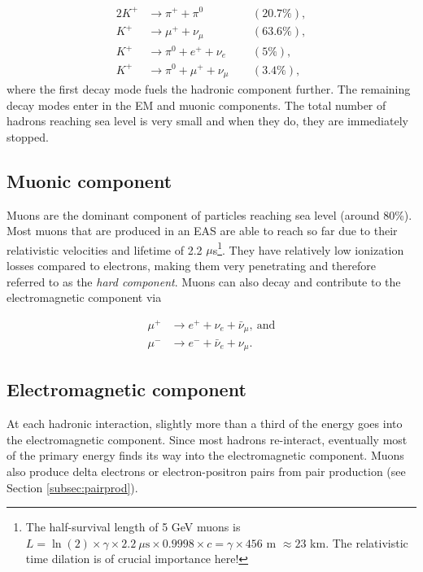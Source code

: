 \begin{alignat}{2}
K^+ &\rightarrow \pi^+ + \pi^0  &&(20.7\%),\nonumber \\
K^+ &\rightarrow \mu^+ + \nu_{\mu}  &&(63.6\%),\nonumber \\
K^+ &\rightarrow \pi^0 + e^+ + \nu_e  &&(5\%),\nonumber \\
K^+ &\rightarrow \pi^0 + \mu^+ + \nu_{\mu}  \ \ &&(3.4\%), \label{eq:hadronic} 
\end{alignat} 
where the first decay mode fuels the hadronic component further. The remaining decay modes enter in the EM and muonic components. The total number of hadrons reaching sea level is very small and when they do, they are immediately stopped.

\subsection{Muonic component}
Muons are the dominant component of particles reaching sea level (around 80\%). Most muons that are produced in an EAS are able to reach so far due to their relativistic velocities and lifetime of 2.2 $\mu$s\footnote{The half-survival length of 5 GeV muons is $L = \ln(2) \times \gamma \times 2.2 \ \mu\textrm{s} \times 0.9998 \times c = \gamma \times 456$ m $\approx 23$ km. The relativistic time dilation is of crucial importance here!}. They have relatively low ionization losses compared to electrons, making them very penetrating and therefore referred to as the \textit{hard component}. Muons can also decay and contribute to the electromagnetic component via

\begin{equation}
\label{eq:muonic}
\begin{split}
\mu^+ &\rightarrow e^+ + \nu_e + \bar{\nu}_\mu, \ \textrm{and} \\
\mu^- &\rightarrow e^- + \bar{\nu}_e + \nu_\mu.
\end{split}
\end{equation}

\subsection{Electromagnetic component}
At each hadronic interaction, slightly more than a third of the energy goes into the electromagnetic component. Since most hadrons re-interact, eventually most of the primary energy finds its way into the electromagnetic component. Muons also produce delta electrons or electron-positron pairs from pair production (see Section \ref{subsec:pairprod}).


